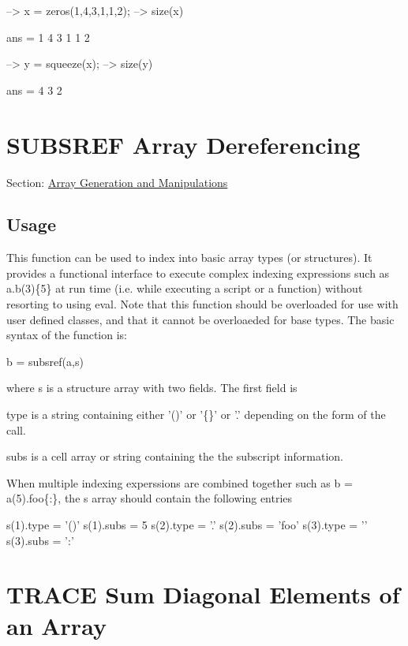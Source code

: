 \begin{DoxyVerbInclude}
--> x = zeros(1,4,3,1,1,2);
--> size(x)

ans = 
 1 4 3 1 1 2 

--> y = squeeze(x);
--> size(y)

ans = 
 4 3 2 
\end{DoxyVerbInclude}
 \hypertarget{array_subsref}{}\section{S\-U\-B\-S\-R\-E\-F Array Dereferencing}\label{array_subsref}
Section\-: \hyperlink{sec_array}{Array Generation and Manipulations} \hypertarget{vtkwidgets_vtkxyplotwidget_Usage}{}\subsection{Usage}\label{vtkwidgets_vtkxyplotwidget_Usage}
This function can be used to index into basic array types (or structures). It provides a functional interface to execute complex indexing expressions such as {\ttfamily a.\-b(3)\{5\}} at run time (i.\-e. while executing a script or a function) without resorting to using {\ttfamily eval}. Note that this function should be overloaded for use with user defined classes, and that it cannot be overloaeded for base types. The basic syntax of the function is\-: \begin{DoxyVerb}   b = subsref(a,s)
\end{DoxyVerb}
 where {\ttfamily s} is a structure array with two fields. The first field is 
\begin{DoxyItemize}
\item {\ttfamily type} is a string containing either {\ttfamily '()'} or {\ttfamily '\{\}'} or {\ttfamily '.'} depending on the form of the call.  
\item {\ttfamily subs} is a cell array or string containing the the subscript information.  
\end{DoxyItemize}When multiple indexing experssions are combined together such as {\ttfamily b = a(5).foo\{\-:\}}, the {\ttfamily s} array should contain the following entries \begin{DoxyVerb}  s(1).type = '()'  s(1).subs = {5}
  s(2).type = '.'   s(2).subs = 'foo'
  s(3).type = '{}'  s(3).subs = ':'
\end{DoxyVerb}
 \hypertarget{array_trace}{}\section{T\-R\-A\-C\-E Sum Diagonal Elements of an Array}\label{array_trace}
